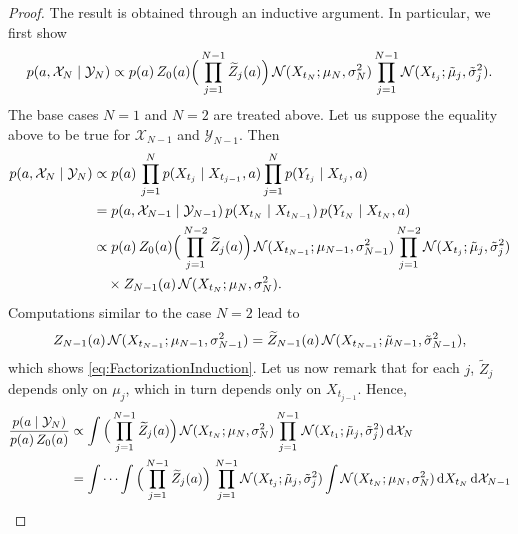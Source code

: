 \documentclass[10pt]{article}
\begin{document}
\begin{proof} The result is obtained through an inductive argument. In particular, we first show
	\begin{equation}\label{eq:FactorizationInduction}
		p(a, \mathcal X_N \mid \mathcal Y_N) \propto p(a) \, Z_0(a) \Big(\prod_{j=1}^{N-1} \widetilde Z_j(a)\Big) \, \mathcal N(X_{t_N}; \mu_N, \sigma_N^2) \prod_{j=1}^{N-1} \mathcal N(X_{t_j}; \tilde \mu_j, \tilde \sigma_j^2).
	\end{equation}
	The base cases $N = 1$ and $N = 2$ are treated above. Let us suppose the equality above to be true for $\mathcal X_{N-1}$ and $\mathcal Y_{N-1}$. Then
	\begin{equation}
	\begin{aligned}
		p(a, \mathcal X_N \mid \mathcal Y_N) &\propto p(a) \, \prod_{j=1}^{N} p(X_{t_j} \mid X_{t_{j-1}}, a) \prod_{j=1}^{N} p(Y_{t_j} \mid X_{t_j}, a) \\
		&= p(a, \mathcal X_{N-1} \mid \mathcal Y_{N-1}) \, p(X_{t_N} \mid X_{t_{N-1}}) \, p(Y_{t_N} \mid X_{t_N}, a)\\
		&\propto p(a) \, Z_0(a) \Big(\prod_{j=1}^{N-2} \widetilde Z_j(a)\Big) \, \mathcal N(X_{t_{N-1}}; \mu_{N-1}, \sigma_{N-1}^2) \prod_{j=1}^{N-2} \mathcal N(X_{t_j}; \tilde \mu_j, \tilde \sigma_j^2)\\
		&\quad \times Z_{N-1}(a) \, \mathcal N(X_{t_N}; \mu_N, \sigma_N^2).
	\end{aligned}
	\end{equation}
	Computations similar to the case $N = 2$ lead to 
	\begin{equation}
		Z_{N-1}(a) \, \mathcal N(X_{t_{N-1}}; \mu_{N-1}, \sigma_{N-1}^2) = \widetilde Z_{N-1}(a) \, \mathcal N(X_{t_{N-1}}; \tilde \mu_{N-1}, \tilde \sigma^2_{N-1}),
	\end{equation}
	which shows \eqref{eq:FactorizationInduction}. Let us now remark that for each $j$, $\tilde Z_j$ depends only on $\mu_j$, which in turn depends only on $X_{t_{j-1}}$.
	Hence, 
	\begin{equation}
	\begin{aligned}
		\frac{p(a \mid \mathcal Y_N)}{p(a) \, Z_0(a)} &\propto  \int \Big(\prod_{j=1}^{N-1} \btilde Z_j(a)\Big) \, \mathcal N(X_{t_N}; \mu_N, \sigma_N^2) \prod_{j=1}^{N-1} \mathcal N(X_{t_1}; \tilde \mu_j, \tilde \sigma_j^2) \, \dd \mathcal X_N\\
		&=  \int \cdots \int \Big(\prod_{j=1}^{N-1} \btilde Z_j(a)\Big) \,  \prod_{j=1}^{N-1} \mathcal N(X_{t_j}; \tilde \mu_j, \tilde \sigma_j^2) \int \mathcal N(X_{t_N}; \mu_N, \sigma_N^2) \, \dd X_{t_N} \, \dd \mathcal X_{N-1} \\

\end{aligned}
\end{equation}
\end{proof}
\end{document}
